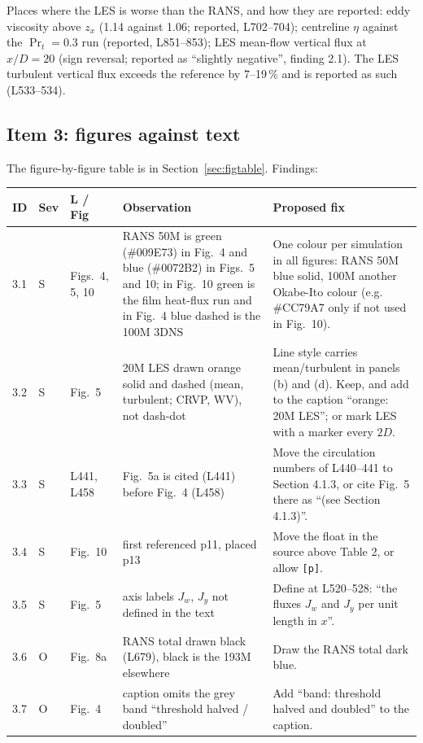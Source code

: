\documentclass[10pt]{article}
\newcommand{\Sf}{S}
\newcommand{\Op}{O}
\begin{document}
Places where the LES is worse than the RANS, and how they are reported: eddy viscosity above $z_x$ (1.14 against
1.06; reported, L702--704); centreline $\eta$ against the $\Pr_t=0.3$ run (reported, L851--853); LES mean-flow
vertical flux at $x/D=20$ (sign reversal; reported as ``slightly negative'', finding 2.1). The LES turbulent
vertical flux exceeds the reference by 7--19\,\% and is reported as such (L533--534).

\subsection{Item 3: figures against text}

The figure-by-figure table is in Section~\ref{sec:figtable}. Findings:

{\small
\begin{longtable}{@{}l l L{1.5cm} L{5.0cm} L{6.6cm}@{}}
\toprule
ID & Sev & L / Fig & Observation & Proposed fix \\
\midrule
{} & \Sf & Figs.~4, 5, 10 & RANS 50M is green (\#009E73) in Fig.~4 and blue (\#0072B2) in Figs.~5 and 10; in
Fig.~10 green is the film heat-flux run and in Fig.~4 blue dashed is the 100M 3DNS & One colour per simulation in
all figures: RANS 50M blue solid, 100M another Okabe-Ito colour (e.g. \#CC79A7 only if not used in Fig.~10). \\
3.2 & \Sf & Fig.~5 & 20M LES drawn orange solid and dashed (mean, turbulent; CRVP, WV), not dash-dot & Line
style carries mean/turbulent in panels (b) and (d). Keep, and add to the caption ``orange: 20M LES''; or mark LES
with a marker every $2D$. \\
3.3 & \Sf & L441, L458 & Fig.~5a is cited (L441) before Fig.~4 (L458) & Move the circulation numbers of L440--441
to Section 4.1.3, or cite Fig.~5 there as ``(see Section 4.1.3)''. \\
3.4 & \Sf & Fig.~10 & first referenced p11, placed p13 & Move the float in the source above Table 2, or allow
\texttt{[p]}. \\
3.5 & \Sf & Fig.~5 & axis labels $J_w$, $J_y$ not defined in the text & Define at L520--528: ``the fluxes $J_w$ and
$J_y$ per unit length in $x$''. \\
3.6 & \Op & Fig.~8a & RANS total drawn black (L679), black is the 193M elsewhere & Draw the RANS total dark blue. \\
3.7 & \Op & Fig.~4 & caption omits the grey band ``threshold halved / doubled'' & Add ``band: threshold halved and
doubled'' to the caption. \\

\end{longtable}}
\end{document}
